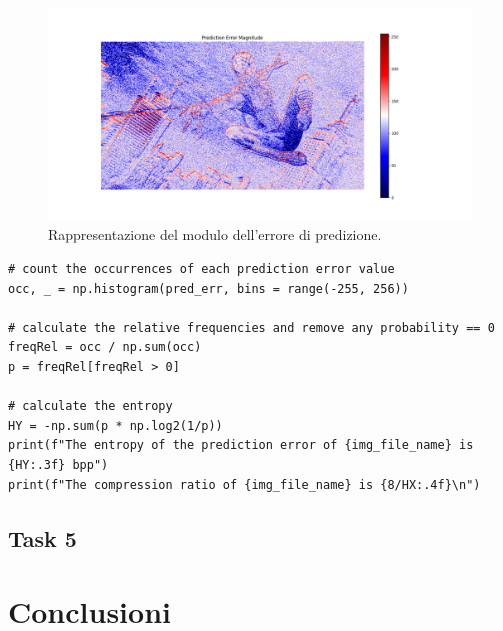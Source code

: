 \begin{figure}[h]
    \centering
    \includegraphics[width = .9\textwidth]{hw-1/report/imgs/prediction-error-magnitude.png}
    \caption{Rappresentazione del modulo dell'errore di predizione.}
    \label{fig:error-prediction-magnitude}
\end{figure}

\begin{lstlisting}
# count the occurrences of each prediction error value
occ, _ = np.histogram(pred_err, bins = range(-255, 256))

# calculate the relative frequencies and remove any probability == 0
freqRel = occ / np.sum(occ)
p = freqRel[freqRel > 0]

# calculate the entropy
HY = -np.sum(p * np.log2(1/p))
print(f"The entropy of the prediction error of {img_file_name} is {HY:.3f} bpp")
print(f"The compression ratio of {img_file_name} is {8/HX:.4f}\n")
\end{lstlisting}

\subsection*{Task 5}



\section{Conclusioni}


